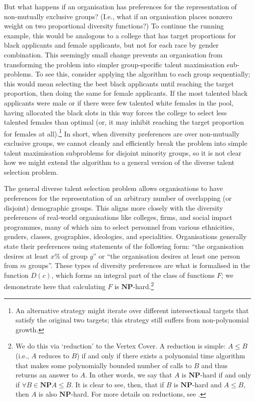 But what happens if an organisation has preferences for the representation of non-mutually exclusive groups? (I.e., what if an organisation places nonzero weight on two proportional diversity functions?) To continue the running example, this would be analogous to a college that has target proportions for black applicants and female applicants, but not for each race by gender combination. This seemingly small change prevents an organisation from transforming the problem into simpler group-specific talent maximisation sub-problems. To see this, consider applying the \textcite{kleinberg2018algorithmic} algorithm to each group sequentially; this would mean selecting the best black applicants until reaching the target proportion, then doing the same for female applicants. If the most talented black applicants were male or if there were few talented white females in the pool, having allocated the black slots in this way forces the college to select less talented females than optimal (or, it may inhibit reaching the target proportion for females at all).\footnote{An alternative strategy might iterate over different intersectional targets that satisfy the original two targets; this strategy still suffers from non-polynomial growth.} In short, when diversity preferences are over non-mutually exclusive groups, we cannot cleanly and efficiently break the problem into simple talent maximisation subproblems for disjoint minority groups, so it is not clear how we might extend the \textcite{kleinberg2018algorithmic} algorithm to a general version of the diverse talent selection problem. 

The general diverse talent selection problem allows organisations to have preferences for the representation of an arbitrary number of overlapping (or disjoint) demographic groups. This aligns more closely with the diversity preferences of real-world organisations like colleges, firms, and social impact programmes, many of which aim to select personnel from various ethnicities, genders, classes, geographies, ideologies, and specialities. Organisations generally state their preferences using statements of the following form: ``the organisation desires at least $x\%$ of group $g$'' or ``the organisation desires at least one person from $m$ groups''. These types of diversity preferences are what is formalised in the function $D(c)$, which forms an integral part of the class of functions $F$; we demonstrate here that calculating $F$ is $\mathbf{NP}$-hard.\footnote{We do this via `reduction' to the Vertex Cover. A reduction is simple: $A \leq B$ (i.e., $A$ reduces to $B$) if and only if there exists a polynomial time algorithm that makes some polynomially bounded number of calls to $B$ and thus returns an answer to $A$. In other words, we say that $A$ is $\mathbf{NP}$-hard if and only if $\forall B \in \mathbf{NP} A \leq B$. It is clear to see, then, that if $B$ is $\mathbf{NP}$-hard and $A \leq B$, then $A$ is also $\mathbf{NP}$-hard. For more details on reductions, see \textcite{10.5555/1074100.1074233}.}

